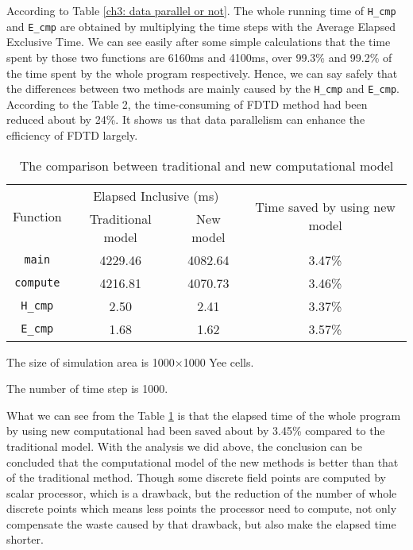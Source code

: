 According to Table \ref{ch3: data parallel or not}. The whole running time of \lstinline|H_cmp| and \lstinline|E_cmp| are obtained by multiplying the time steps with the Average Elapsed Exclusive Time. We can see easily after some simple calculations that the time
spent by those two functions are 6160ms and 4100ms, over 99.3\% and 99.2\% of the time spent by the whole program respectively. Hence, we can say safely that the differences between two methods are mainly caused by the \lstinline|H_cmp| and \lstinline|E_cmp|. According to the Table 2, the time-consuming of FDTD method had been reduced about by 24\%. It shows us that data parallelism can enhance the efficiency of FDTD largely.

\begin{table}[hp]
\centering
\caption{The comparison between traditional and new computational model}\label{ch3: tradition or new}
\begin{threeparttable}
	\begin{tabular}{cccc}
		\toprule
		\multirow{2}{3em}{Function}&\multicolumn{2}{c}{Elapsed Inclusive (ms)} & \multirow{2}{13em}{Time saved by using new model}\\ 
		\cline{2-3}
		& Traditional model & New model & \\ 
		
		\midrule
		\lstinline|main| & 4229.46 & 4082.64 & 3.47\% \\ 
		\lstinline|compute| & 4216.81 & 4070.73 & 3.46\%\\ 
		\lstinline|H_cmp|& 2.50 & 2.41 & 3.37\%\\ 
		\lstinline|E_cmp|& 1.68 & 1.62 & 3.57\% \\
		\bottomrule
	\end{tabular}
	\begin{tablenotes}
		\item[1] The size of simulation area is 1000$\times$1000 Yee cells.
		\item[2] The number of time step is 1000.
	\end{tablenotes}
\end{threeparttable}
\end{table}

What we can see from the Table \ref{ch3: tradition or new} is that the elapsed time of the whole program by using new computational had been saved about by 3.45\% compared to the traditional model. With the analysis we did above, the conclusion can be concluded that the computational model of the new methods is better than that of the traditional method. Though some discrete field points are computed by scalar processor, which is a drawback, but the reduction of the number of whole discrete points which means less points the processor need to compute, not only compensate the waste caused by that drawback, but also make the elapsed time shorter.

